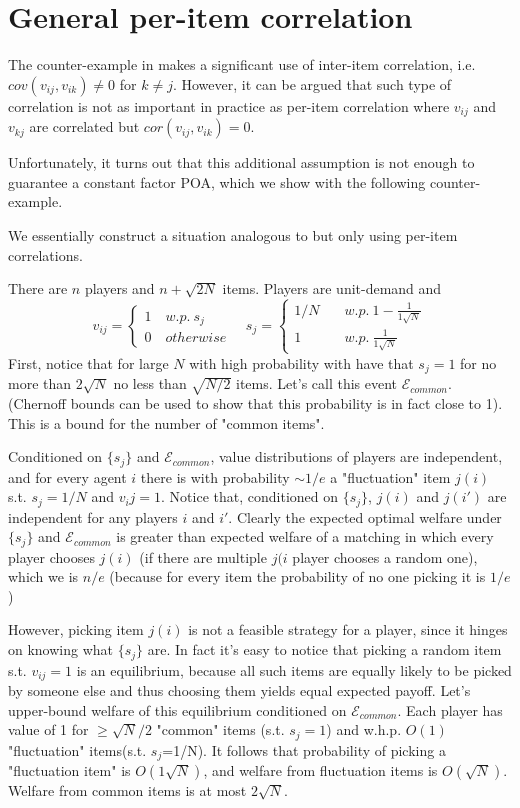 \section{General per-item correlation}

The counter-example in \cite{roughgarden} makes a significant use of inter-item correlation, i.e. $cov(v_{ij},v_{ik})\neq 0$ for $k\neq j$. However, it can be argued that such type of correlation is not as important in practice as per-item correlation where $v_{ij}$ and $v_{kj}$ are correlated but $cor(v_{ij},v_{ik}) = 0$. 


Unfortunately, it turns out that this additional assumption is not enough to guarantee a constant factor POA, which we show with the following counter-example.

\begin{example}
We essentially construct a situation analogous to \cite{roughgarden} but only using per-item correlations.

There are $n$ players and $n+\sqrt{2N}$ items. Players are unit-demand and 
$$v_{ij} =\begin{cases} 
1\quad w.p.\ s_j\\
0\quad otherwise
\end{cases}
\quad
s_j = \begin{cases}
1/N \quad &w.p.\ 1-\frac{1}{1\sqrt{N}}\\
1 \quad &w.p.\ \frac{1}{1\sqrt{N}}
\end{cases}
$$
First, notice that for large $N$ with high probability with have that $s_j=1$ for no more than $2\sqrt{N}$ no less than $\sqrt{N/2}$ items. Let's call this event $\mathcal{E}_{common}$. (Chernoff bounds can be used to show that this probability is in fact close to 1). This is a bound for the number of "common items".

Conditioned on $\{s_j\}$ and $\mathcal{E}_{common}$, value distributions of players are independent, and for every agent $i$ there is with probability $\sim 1/e$ a "fluctuation" item $j(i)$ s.t. $s_j=1/N$ and $v_ij = 1$. Notice that, conditioned on $\{s_j\}$, $j(i)$ and $j(i')$ are independent for any players $i$ and $i'$. Clearly the expected optimal welfare under $\{s_j\}$ and $\mathcal{E}_{common}$ is greater than expected welfare of a matching in which every player chooses $j(i)$ (if there are multiple $j(i$ player chooses a random one), which we is $n/e$ (because for every item the probability of no one picking it is $1/e$)

However, picking item $j(i)$ is not a feasible strategy for a player, since it hinges on knowing what $\{s_j\}$ are. In fact it's easy to notice that picking a random item s.t. $v_{ij}=1$ is an equilibrium, because all such items are equally likely to be picked by someone else and thus choosing them yields equal expected payoff. Let's upper-bound welfare of this equilibrium conditioned on $\mathcal{E}_{common}$. Each player has value of 1 for $\geq\sqrt{N}/2$  "common" items (s.t. $s_j=1$) and w.h.p. $O(1)$ "fluctuation" items(s.t. $s_j$=1/N). It follows that probability of picking a "fluctuation item" is $O(1\sqrt{N})$, and welfare from fluctuation items is $O(\sqrt{N})$. Welfare from common items is at most $2\sqrt{N}$.


\end{example}
